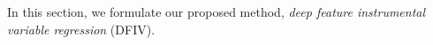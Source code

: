 In this section, we formulate our proposed method, {\it deep feature instrumental variable regression} (DFIV).%